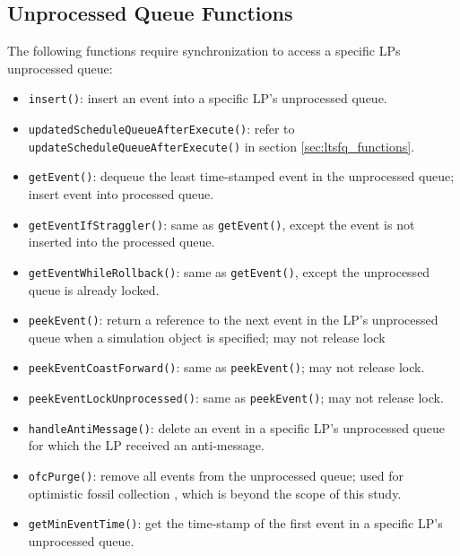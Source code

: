 \documentclass[11pt]{book}
\begin{document}
\subsection{Unprocessed Queue Functions}

The following functions require synchronization to access a specific LPs unprocessed
queue:

\vspace*{-\bigskipamount}
\begin{singlespace}
\begin{itemize}
  \item\texttt{insert()}: insert an event into a specific LP's unprocessed queue.
  \item\texttt{updatedScheduleQueueAfterExecute()}: refer to
      \texttt{updateScheduleQueueAfterExecute()} in section
      \ref{sec:ltsfq_functions}. 
  \item\texttt{getEvent()}: dequeue the least time-stamped event in the
    unprocessed queue; insert event into processed queue.
  \item\texttt{getEventIfStraggler()}: same as \texttt{getEvent()}, except the
      event is not inserted into the processed queue.
  \item\texttt{getEventWhileRollback()}: same as \texttt{getEvent()}, except the unprocessed queue
    is already locked.
  \item\texttt{peekEvent()}: return a reference to the next event in the LP's unprocessed
    queue when a simulation object is specified; may not release lock 
  \item\texttt{peekEventCoastForward()}: same as \texttt{peekEvent()}; may not
      release lock.
  \item\texttt{peekEventLockUnprocessed()}: same as \texttt{peekEvent()}; may
      not release lock.  
  \item\texttt{handleAntiMessage()}: delete an event in a specific LP's unprocessed queue
    for which the LP received an anti-message.
  \item\texttt{ofcPurge()}: remove all events from the unprocessed queue; used for
    optimistic fossil collection \cite{young-98}, which is beyond the scope of this study.
  \item\texttt{getMinEventTime()}: get the time-stamp of the first event in a specific
    LP's unprocessed queue.
\end{itemize}
\end{singlespace}
\end{document}
